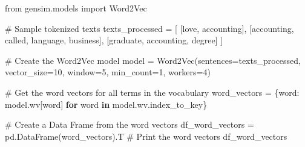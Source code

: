 \documentclass[
  letterpaper,
  DIV=11,
  numbers=noendperiod]{scrreprt}
\newenvironment{Shaded}{\begin{snugshade}}{\end{snugshade}}
\newcommand{\CommentTok}[1]{\textcolor[rgb]{0.37,0.37,0.37}{#1}}
\newcommand{\ControlFlowTok}[1]{\textcolor[rgb]{0.00,0.23,0.31}{\textbf{#1}}}
\newcommand{\DecValTok}[1]{\textcolor[rgb]{0.68,0.00,0.00}{#1}}
\newcommand{\ImportTok}[1]{\textcolor[rgb]{0.00,0.46,0.62}{#1}}
\newcommand{\KeywordTok}[1]{\textcolor[rgb]{0.00,0.23,0.31}{\textbf{#1}}}
\newcommand{\NormalTok}[1]{\textcolor[rgb]{0.00,0.23,0.31}{#1}}
\newcommand{\OperatorTok}[1]{\textcolor[rgb]{0.37,0.37,0.37}{#1}}
\newcommand{\StringTok}[1]{\textcolor[rgb]{0.13,0.47,0.30}{#1}}
\begin{document}
\begin{Shaded}
\begin{Highlighting}[]
\ImportTok{from}\NormalTok{ gensim.models }\ImportTok{import}\NormalTok{ Word2Vec}

\CommentTok{\# Sample tokenized texts}
\NormalTok{texts\_processed }\OperatorTok{=}\NormalTok{ [}
\NormalTok{    [}\StringTok{\textquotesingle{}love\textquotesingle{}}\NormalTok{, }\StringTok{\textquotesingle{}accounting\textquotesingle{}}\NormalTok{],}
\NormalTok{    [}\StringTok{\textquotesingle{}accounting\textquotesingle{}}\NormalTok{, }\StringTok{\textquotesingle{}called\textquotesingle{}}\NormalTok{, }\StringTok{\textquotesingle{}language\textquotesingle{}}\NormalTok{, }\StringTok{\textquotesingle{}business\textquotesingle{}}\NormalTok{],}
\NormalTok{    [}\StringTok{\textquotesingle{}graduate\textquotesingle{}}\NormalTok{, }\StringTok{\textquotesingle{}accounting\textquotesingle{}}\NormalTok{, }\StringTok{\textquotesingle{}degree\textquotesingle{}}\NormalTok{]}
\NormalTok{]}

\CommentTok{\# Create the Word2Vec model}
\NormalTok{model }\OperatorTok{=}\NormalTok{ Word2Vec(sentences}\OperatorTok{=}\NormalTok{texts\_processed, vector\_size}\OperatorTok{=}\DecValTok{10}\NormalTok{, window}\OperatorTok{=}\DecValTok{5}\NormalTok{, min\_count}\OperatorTok{=}\DecValTok{1}\NormalTok{, workers}\OperatorTok{=}\DecValTok{4}\NormalTok{)}

\CommentTok{\# Get the word vectors for all terms in the vocabulary}
\NormalTok{word\_vectors }\OperatorTok{=}\NormalTok{ \{word: model.wv[word] }\ControlFlowTok{for}\NormalTok{ word }\KeywordTok{in}\NormalTok{ model.wv.index\_to\_key\}}

\CommentTok{\# Create a Data Frame from the word vectors }
\NormalTok{df\_word\_vectors }\OperatorTok{=}\NormalTok{ pd.DataFrame(word\_vectors).T}
\CommentTok{\# Print the word vectors}
\NormalTok{df\_word\_vectors}
\end{Highlighting}
\end{Shaded}
\end{document}

